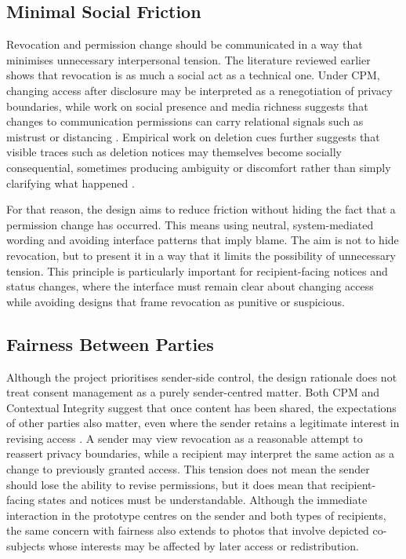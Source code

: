 \subsection{Minimal Social Friction}
Revocation and permission change should be communicated in a way that minimises unnecessary interpersonal tension. The literature reviewed earlier shows that revocation is as much a social act as a technical one. Under CPM, changing access after disclosure may be interpreted as a renegotiation of privacy boundaries, while work on social presence and media richness suggests that changes to communication permissions can carry relational signals such as mistrust or distancing \cite{petronio_cpm_2020,daft_lengel_mrt_1986,short_williams_christie_1976,ishii_etal_2019}. Empirical work on deletion cues further suggests that visible traces such as deletion notices may themselves become socially consequential, sometimes producing ambiguity or discomfort rather than simply clarifying what happened \cite{schnitzler_2020}.

For that reason, the design aims to reduce friction without hiding the fact that a permission change has occurred. This means using neutral, system-mediated wording and avoiding interface patterns that imply blame. The aim is not to hide revocation, but to present it in a way that it limits the possibility of unnecessary tension. This principle is particularly important for recipient-facing notices and status changes, where the interface must remain clear about changing access while avoiding designs that frame revocation as punitive or suspicious.

\subsection{Fairness Between Parties }
Although the project prioritises sender-side control, the design rationale does not treat consent management as a purely sender-centred matter. Both CPM and Contextual Integrity suggest that once content has been shared, the expectations of other parties also matter, even where the sender retains a legitimate interest in revising access \cite{petronio_cpm_2020,nissenbaum_contextual_2011}. A sender may view revocation as a reasonable attempt to reassert privacy boundaries, while a recipient may interpret the same action as a change to previously granted access. This tension does not mean the sender should lose the ability to revise permissions, but it does mean that recipient-facing states and notices must be understandable. Although the immediate interaction in the prototype centres on the sender and both types of recipients, the same concern with fairness also extends to photos that involve depicted co-subjects whose interests may be affected by later access or redistribution.

